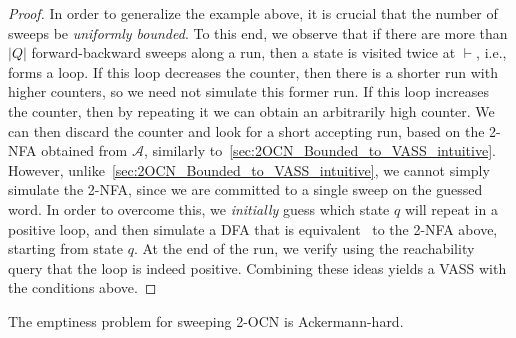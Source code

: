 \documentclass[USenglish]{lipics-v2021}
\newcommand{\lmark}{\vdash}
\newcommand{\cA}{\mathcal{A}}
\begin{document}
\begin{proof}
	In order to generalize the example above, it is crucial that the number of
	sweeps be \emph{uniformly bounded}. To this end, we observe that if there are
	more than $|Q|$ forward-backward sweeps along a run, then a state is visited
	twice at $\lmark$, i.e., forms a loop. If this loop decreases the counter, then
	there is a shorter run with higher counters, so we need not simulate this former
	run.  If this loop increases the counter, then by repeating it we can obtain an
	arbitrarily high counter. We can then discard the counter and look for a short
	accepting run, based on the 2-NFA obtained from $\cA$, similarly
	to~\cref{sec:2OCN_Bounded_to_VASS_intuitive}.  However,
	unlike~\cref{sec:2OCN_Bounded_to_VASS_intuitive}, we cannot simply simulate the
	2-NFA, since we are committed to a single sweep on the guessed word. In order to
	overcome this, we \emph{initially} guess which state \(q\) will repeat in a positive loop,
	and then simulate a DFA that is
	equivalent~\cite{shepherdson1959reduction,rabin1959finite,vardi1989note} to the
	2-NFA above, starting from state $q$. At the end of the run, we verify using the
	reachability query that the loop is indeed positive.
	Combining these ideas yields a VASS with the conditions above.
\end{proof}
%
\begin{theorem}
	\label{lem:ackermann_hard_sweeping} The emptiness problem for sweeping
	2-OCN is Ackermann-hard.
\end{theorem}
\end{document}
